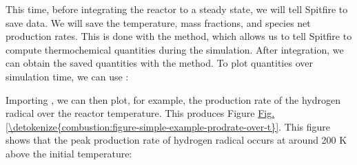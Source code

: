 \documentclass[letterpaper,10pt,english]{sphinxmanual}
\begin{document}
This time, before integrating the reactor to a steady state, we will tell Spitfire to save data.
We will save the temperature, mass fractions, and species net production rates.
This is done with the  method, which allows us to tell Spitfire to compute thermochemical quantities  during the simulation.
After integration, we can obtain the saved quantities with the  method.
To plot quantities over simulation time, we can use :

\begin{sphinxVerbatim}[commandchars=\\\{\}]
\PYG{p}{[}  \PYG{p}{]}


      
  
  
  
\end{sphinxVerbatim}

Importing , we can then plot, for example, the production rate of the hydrogen radical over the reactor temperature.
This produces Figure \hyperref[\detokenize{combustion:figure-simple-example-prodrate-over-t}]{Fig.\@ \ref{\detokenize{combustion:figure-simple-example-prodrate-over-t}}}.
This figure shows that the peak production rate of hydrogen radical occurs at around 200 K above the initial temperature:

\begin{sphinxVerbatim}[commandchars=\\\{\}]
 
\end{sphinxVerbatim}
\end{document}
